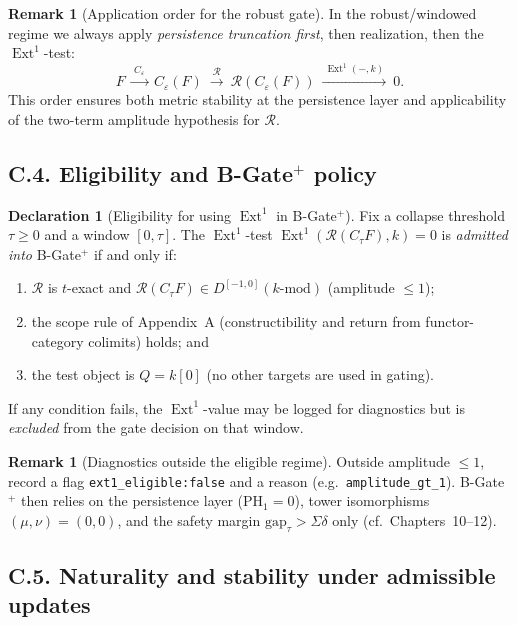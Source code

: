 \documentclass[11pt]{article}
\DeclareMathOperator{\Ext}{Ext}
\numberwithin{equation}{section}
\theoremstyle{definition}
\newtheorem{remark}[theorem]{Remark}
\newtheorem{declaration}[theorem]{Declaration}
\begin{document}
\begin{remark}[Application order for the robust gate]
In the robust/windowed regime we always apply \emph{persistence truncation first}, then realization, then the \(\Ext^1\)-test:
\[
F\ \xrightarrow{\ C_\varepsilon\ }\ C_\varepsilon(F)\ \xrightarrow{\ \mathcal{R}\ }\ \mathcal{R}(C_\varepsilon(F))\ \xrightarrow{\ \Ext^1(-,k)\ }\ 0.
\]
This order ensures both metric stability at the persistence layer and applicability of the two-term amplitude hypothesis for \(\mathcal{R}\).
\end{remark}

\subsection*{C.4. Eligibility and B-Gate\texorpdfstring{$^{+}$}{+} policy}

\begin{declaration}[Eligibility for using \(\Ext^1\) in B-Gate\(^{+}\)]\label{C:decl:eligibility}
Fix a collapse threshold \(\tau\ge 0\) and a window \([0,\tau]\).
The \(\Ext^1\)-test \(\Ext^1(\mathcal{R}(C_\tau F),k)=0\) is \emph{admitted into} B-Gate\(^{+}\) if and only if:
\begin{enumerate}\itemsep0.2em
  \item \(\mathcal{R}\) is \(t\)-exact and \(\mathcal{R}(C_\tau F)\in D^{[-1,0]}(k\text{-mod})\) (amplitude \(\le 1\));
  \item the scope rule of Appendix~A (constructibility and return from functor-category colimits) holds; and
  \item the test object is \(Q=k[0]\) (no other targets are used in gating).
\end{enumerate}
If any condition fails, the \(\Ext^1\)-value may be logged for diagnostics but is \emph{excluded} from the gate decision on that window.
\end{declaration}

\begin{remark}[Diagnostics outside the eligible regime]
Outside amplitude \(\le 1\), record a flag \texttt{ext1\_eligible:false} and a reason (e.g.\ \texttt{amplitude\_gt\_1}).
B-Gate\(^{+}\) then relies on the persistence layer (\(\mathrm{PH}_1=0\)), tower isomorphisms \((\mu,\nu)=(0,0)\), and the safety margin \(\mathrm{gap}_\tau>\Sigma\delta\) only (cf.\ Chapters~10–12).
\end{remark}

\subsection*{C.5. Naturality and stability under admissible updates}
\end{document}
